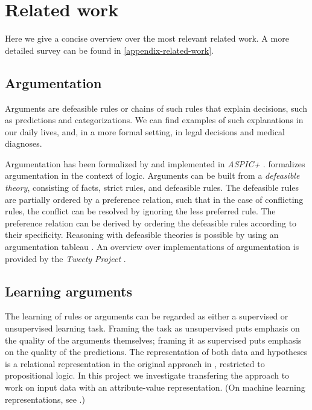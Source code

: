 \label{related_work}
\chapter{Related work}
 
Here we give a concise overview over the most relevant related work. A more detailed survey can be found in \autoref{appendix-related-work}.

\section{Argumentation}

Arguments are defeasible rules or chains of such rules that explain decisions, such as predictions and categorizations. We can find examples of such explanations in our daily lives, and, in a more formal setting, in legal decisions and medical diagnoses.

Argumentation has been formalized by \cite{dungAcceptabilityArgumentsIts1995} and implemented in \textit{ASPIC+} \citep{modgilASPICFrameworkStructured2014}. \cite{roosResolvingConflictsArguments2000} formalizes argumentation in the context of logic. Arguments can be built from a \textit{defeasible theory}, consisting of facts, strict rules, and defeasible rules. The defeasible rules are partially ordered by a preference relation, such that in the case of conflicting rules, the conflict can be resolved by ignoring the less preferred rule. The preference relation can be derived by ordering the defeasible rules according to their specificity. Reasoning with defeasible theories is possible by using an argumentation tableau \citep{roosSemanticTableauMethod2020}. An overview over implementations of argumentation is provided by the \textit{Tweety Project} \cite{thimmTweetyProjectComprehensiveCollection2021}.

\section{Learning arguments}

The learning of rules or arguments can be regarded as either a supervised or unsupervised learning task. Framing the task as unsupervised puts emphasis on the quality of the arguments themselves; framing it as supervised puts emphasis on the quality of the predictions. 
The representation of both data and hypotheses is a relational representation in the original approach in \cite{verheijProofProbabilities2017}, restricted to propositional logic. In this project we investigate transfering the approach to work on input data with an attribute-value representation. (On machine learning representations, see \cite{deraedtLogicalRelationalLearning2008}.)

